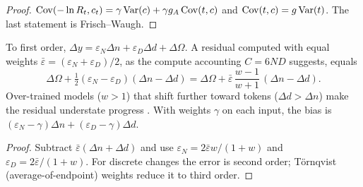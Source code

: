 \begin{proof}
$\operatorname{Cov}(-\ln R_t,c_t)=\gamma\operatorname{Var}(c)+\gamma g_A\operatorname{Cov}(t,c)$ and $\operatorname{Cov}(t,c)=g\operatorname{Var}(t)$. The last statement is Frisch--Waugh.
\end{proof}

\begin{corollary}\label{cor:hall}
To first order, $\Delta y=\varepsilon_N\Delta n+\varepsilon_D\Delta d+\Delta\Omega$. A residual computed with equal weights
$\bar\varepsilon=(\varepsilon_N+\varepsilon_D)/2$, as the compute accounting $C=6ND$ suggests, equals
\[
\Delta\Omega+\tfrac12(\varepsilon_N-\varepsilon_D)(\Delta n-\Delta d)=\Delta\Omega+\bar\varepsilon\,\frac{w-1}{w+1}\,(\Delta n-\Delta d).
\]
Over-trained models ($w>1$) that shift further toward tokens ($\Delta d>\Delta n$) make the residual understate progress
\citep[the analog of][]{hall1988relation}. With weights $\gamma$ on each input, the bias is
$(\varepsilon_N-\gamma)\Delta n+(\varepsilon_D-\gamma)\Delta d$.
\end{corollary}

\begin{proof}
Subtract $\bar\varepsilon(\Delta n+\Delta d)$ and use $\varepsilon_N=2\bar\varepsilon w/(1+w)$ and
$\varepsilon_D=2\bar\varepsilon/(1+w)$. For discrete changes the error is second order; Törnqvist (average-of-endpoint)
weights reduce it to third order.
\end{proof}
